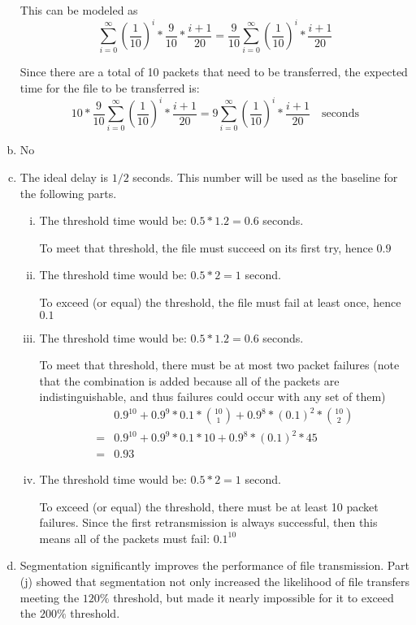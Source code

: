 \documentclass[11pt]{article}
\begin{document}
\begin{enumerate}[(a)]
      This can be modeled as
      \[ \sum_{i=0}^{\infty} \left( \frac{1}{10} \right)^i * \frac{9}{10} * \frac{i+1}{20}
        = \frac{9}{10} \sum_{i=0}^{\infty} \left( \frac{1}{10} \right)^i * \frac{i+1}{20}
      \]

      Since there are a total of 10 packets that need to be transferred, the
      expected time for the file to be transferred is:
      \[ 10 * \frac{9}{10} \sum_{i=0}^{\infty} \left( \frac{1}{10} \right)^i * \frac{i+1}{20} = \boxed{9 \sum_{i=0}^{\infty} \left( \frac{1}{10} \right)^i * \frac{i+1}{20} \quad \text{seconds}} \]
    \item
      No
    \item
      The ideal delay is $1/2$ seconds. This number will be used as the baseline for
      the following parts.
      \begin{enumerate}[(i)]
        \item
          The threshold time would be: $0.5 * 1.2 = 0.6$ seconds.

          To meet that threshold, the file must succeed on its first try,
          hence $\boxed{0.9}$
        \item
          The threshold time would be: $0.5 * 2 = 1$ second.

          To exceed (or equal) the threshold, the file must fail at least once,
          hence $\boxed{0.1}$
        \item
          The threshold time would be: $0.5 * 1.2 = 0.6$ seconds.

          To meet that threshold, there must be at most two packet failures (note
          that the combination is added because all of the packets are
          indistinguishable, and thus failures could occur with any set of them)
          \begin{align*}
            & 0.9^{10} + 0.9^9 * 0.1 * {10 \choose 1} + 0.9^8 * (0.1)^2 * {10  \choose 2} \\
            =& 0.9^{10} + 0.9^9 * 0.1 * 10 + 0.9^8 * (0.1)^2 * 45 \\
            =& \boxed{0.93}
          \end{align*}
        \item
          The threshold time would be: $0.5 * 2 = 1$ second.

          To exceed (or equal) the threshold, there must be at least 10 packet failures.
          Since the first retransmission is always successful, then this means all
          of the packets must fail: $\boxed{0.1^{10}}$
      \end{enumerate}
    \item
      Segmentation significantly improves the performance of file transmission. Part (j)
      showed that segmentation not only increased the likelihood of file transfers
      meeting the $120\%$ threshold, but made it nearly impossible for it to
      exceed the $200\%$ threshold.


\end{enumerate}
\end{document}
